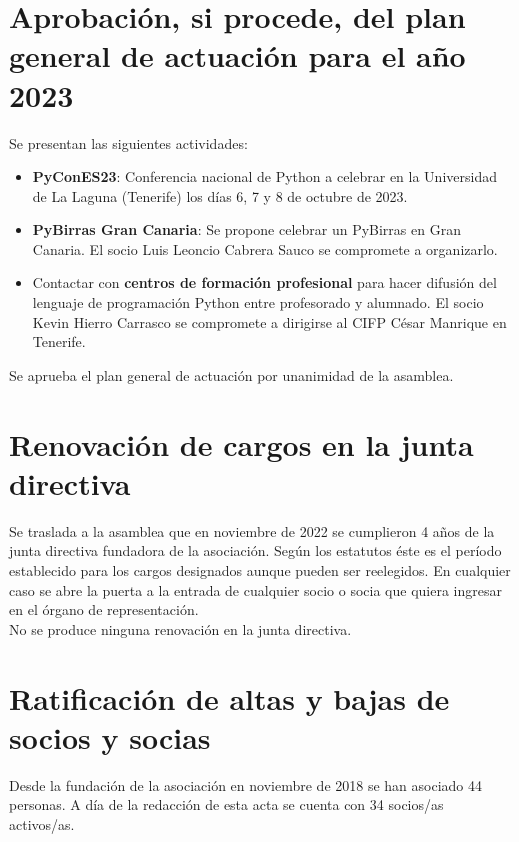 \documentclass[a4paper,12pt]{article}
\begin{document}
\section{Aprobación, si procede, del plan general de actuación para el año 2023}

Se presentan las siguientes actividades:

\begin{itemize}
    \item \textbf{PyConES23}: Conferencia nacional de Python a celebrar en la Universidad de La Laguna (Tenerife) los días 6, 7 y 8 de octubre de 2023.
    \item \textbf{PyBirras Gran Canaria}: Se propone celebrar un PyBirras en Gran Canaria. El socio Luis Leoncio Cabrera Sauco se compromete a organizarlo.
    \item Contactar con \textbf{centros de formación profesional} para hacer difusión del lenguaje de programación Python entre profesorado y alumnado. El socio Kevin Hierro Carrasco se compromete a dirigirse al CIFP César Manrique en Tenerife.
\end{itemize}

Se aprueba el plan general de actuación por unanimidad de la asamblea.\\

\section{Renovación de cargos en la junta directiva}

Se traslada a la asamblea que en noviembre de 2022 se cumplieron 4 años de la junta directiva fundadora de la asociación. Según los estatutos éste es el período establecido para los cargos designados aunque pueden ser reelegidos. En cualquier caso se abre la puerta a la entrada de cualquier socio o socia que quiera ingresar en el órgano de representación.\\

No se produce ninguna renovación en la junta directiva.

\section{Ratificación de altas y bajas de socios y socias}

Desde la fundación de la asociación en noviembre de 2018 se han asociado 44 personas. A día de la redacción de esta acta se cuenta con 34 socios/as activos/as.\\
\end{document}
